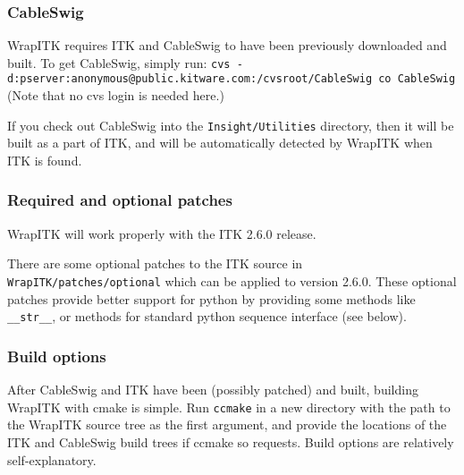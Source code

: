 \documentclass{InsightArticle}
\begin{document}

    \subsubsection{CableSwig}

WrapITK requires ITK and CableSwig to have been previously downloaded and built.
To get CableSwig, simply run:
\verb$cvs -d:pserver:anonymous@public.kitware.com:/cvsroot/CableSwig co CableSwig$
(Note that no cvs login is needed here.)

If you check out CableSwig into the \verb$Insight/Utilities$ directory, then it will be
built as a part of ITK, and will be automatically detected by WrapITK when ITK
is found.

    \subsubsection{Required and optional patches}

WrapITK will work properly with the ITK 2.6.0 release. 

There are some optional
patches to the ITK source in \verb$WrapITK/patches/optional$ which can be applied to
version 2.6.0. These optional patches provide
better support for python by providing some methods like \verb$__str__$, or methods
for standard python sequence interface (see below).

    \subsubsection{Build options}

After CableSwig and ITK have been (possibly patched) and built, building WrapITK
with cmake is simple. Run \verb$ccmake$ in a new directory with the path to the WrapITK
source tree as the first argument, and provide the locations of the ITK and
CableSwig build trees if ccmake so requests. Build options are relatively
self-explanatory.
\end{document}
